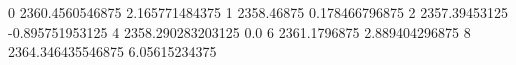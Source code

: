 0 2360.4560546875 2.165771484375
1 2358.46875 0.178466796875
2 2357.39453125 -0.895751953125
4 2358.290283203125 0.0
6 2361.1796875 2.889404296875
8 2364.346435546875 6.05615234375
